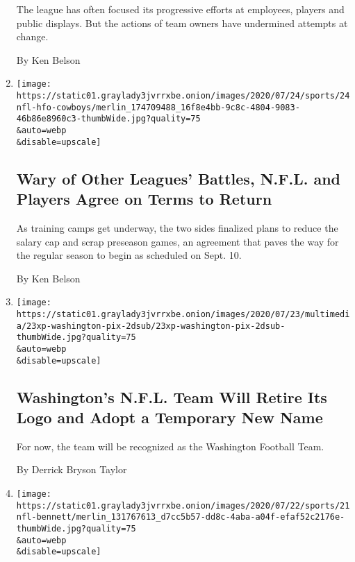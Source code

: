 \begin{enumerate}
  The league has often focused its progressive efforts at employees,
  players and public displays. But the actions of team owners have
  undermined attempts at change.

  By Ken Belson
\item
  \href{/2020/07/24/sports/football/nfl-players-regular-season-start.html}{}

  \texttt{[image: https://static01.graylady3jvrrxbe.onion/images/2020/07/24/sports/24nfl-hfo-cowboys/merlin\_174709488\_16f8e4bb-9c8c-4804-9083-46b86e8960c3-thumbWide.jpg?quality=75\\\&auto=webp\\\&disable=upscale]}

  \hypertarget{wary-of-other-leagues-battles-nfl-and-players-agree-on-terms-to-return}{%
  \subsection{Wary of Other Leagues' Battles, N.F.L. and Players Agree
  on Terms to
  Return}\label{wary-of-other-leagues-battles-nfl-and-players-agree-on-terms-to-return}}

  As training camps get underway, the two sides finalized plans to
  reduce the salary cap and scrap preseason games, an agreement that
  paves the way for the regular season to begin as scheduled on Sept.
  10.

  By Ken Belson
\item
  \href{/2020/07/23/sports/football/washington-football-team-name-logo.html}{}

  \texttt{[image: https://static01.graylady3jvrrxbe.onion/images/2020/07/23/multimedia/23xp-washington-pix-2dsub/23xp-washington-pix-2dsub-thumbWide.jpg?quality=75\\\&auto=webp\\\&disable=upscale]}

  \hypertarget{washingtons-nfl-team-will-retire-its-logo-and-adopt-a-temporary-new-name}{%
  \subsection{Washington's N.F.L. Team Will Retire Its Logo and Adopt a
  Temporary New
  Name}\label{washingtons-nfl-team-will-retire-its-logo-and-adopt-a-temporary-new-name}}

  For now, the team will be recognized as the Washington Football Team.

  By Derrick Bryson Taylor
\item
  \href{/2020/07/21/sports/football/michael-bennett-retire-nfl.html}{}

  \texttt{[image: https://static01.graylady3jvrrxbe.onion/images/2020/07/22/sports/21nfl-bennett/merlin\_131767613\_d7cc5b57-dd8c-4aba-a04f-efaf52c2176e-thumbWide.jpg?quality=75\\\&auto=webp\\\&disable=upscale]}


\end{enumerate}
